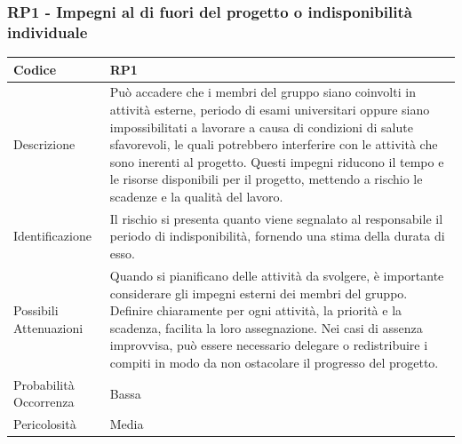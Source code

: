 \documentclass[10pt]{article}
\begin{document}
{    \subsubsection{RP1 - Impegni al di fuori del progetto o indisponibilità individuale}
    \label{RP1}
    \begin{tabularx}{\textwidth}{|l|X|}
    \hline
    Codice & RP1 \\
    \hline
    Descrizione &  Può accadere che i membri del gruppo siano coinvolti in attività esterne, periodo di esami universitari oppure siano impossibilitati a lavorare a causa di condizioni di salute sfavorevoli, le quali potrebbero interferire con le attività che sono inerenti al progetto. Questi impegni riducono il tempo e le risorse disponibili per il progetto, mettendo a rischio le scadenze e la qualità del lavoro. \\
    \hline
    Identificazione & Il rischio si presenta quanto viene segnalato al responsabile il periodo di indisponibilità, fornendo una stima della durata di esso. \\
    \hline
    Possibili Attenuazioni &  Quando si pianificano delle attività da svolgere, è importante considerare gli impegni esterni dei membri del gruppo. Definire chiaramente per ogni attività, la priorità e la scadenza, facilita la loro assegnazione. Nei casi di assenza improvvisa, può essere necessario delegare o redistribuire i compiti in modo da non ostacolare il progresso del progetto. \\
    \hline
    Probabilità Occorrenza &  Bassa \\
    \hline
    Pericolosità & Media \\ 
    \hline
    \end{tabularx}
    

}
\end{document}
